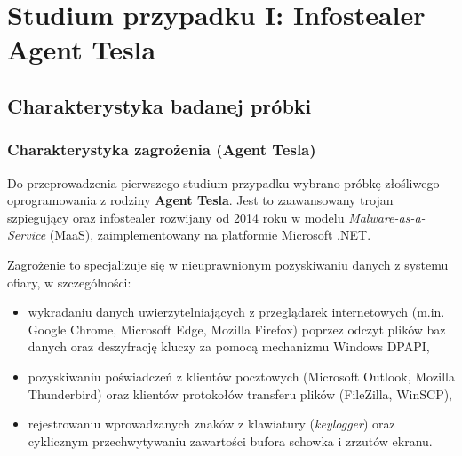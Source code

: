 \chapter{Studium przypadku I: Infostealer Agent Tesla}\label{ch:studium_przypadku_1}

\section{Charakterystyka badanej próbki}\label{sec:cs1_charakterystyka}

\subsection{Charakterystyka zagrożenia (Agent Tesla)}
Do przeprowadzenia pierwszego studium przypadku wybrano próbkę złośliwego oprogramowania z rodziny \textbf{Agent Tesla}. Jest to zaawansowany trojan szpiegujący oraz infostealer rozwijany od 2014 roku w modelu \textit{Malware-as-a-Service} (MaaS), zaimplementowany na platformie Microsoft .NET.

Zagrożenie to specjalizuje się w nieuprawnionym pozyskiwaniu danych z systemu ofiary, w szczególności:
\begin{itemize}
    \item wykradaniu danych uwierzytelniających z przeglądarek internetowych (m.in. Google Chrome, Microsoft Edge, Mozilla Firefox) poprzez odczyt plików baz danych  oraz deszyfrację kluczy za pomocą mechanizmu Windows DPAPI,
    \item pozyskiwaniu poświadczeń z klientów pocztowych (Microsoft Outlook, Mozilla Thunderbird) oraz klientów protokołów transferu plików (FileZilla, WinSCP),
    \item rejestrowaniu wprowadzanych znaków z klawiatury (\textit{keylogger}) oraz cyklicznym przechwytywaniu zawartości bufora schowka i zrzutów ekranu.
\end{itemize}

